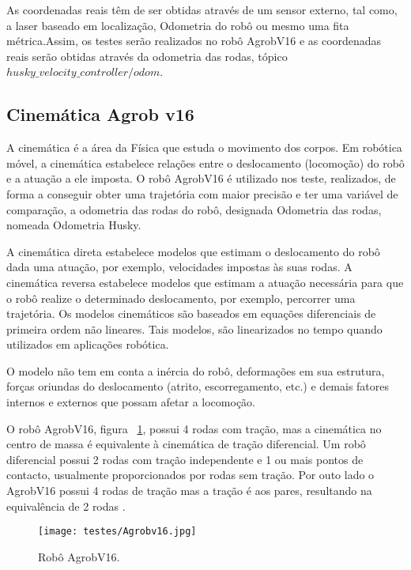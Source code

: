 As coordenadas reais têm de ser obtidas através de um sensor externo, tal como, a laser baseado em localização, Odometria do robô ou mesmo uma fita métrica.Assim, os testes serão realizados no robô AgrobV16 e as coordenadas reais serão obtidas através da odometria das rodas, tópico \textit{$husky\_velocity\_controller/odom$}.

\subsection{Cinemática Agrob v16}

A cinemática é a área da Física que estuda o movimento dos corpos. Em robótica móvel, a cinemática estabelece relações entre o deslocamento (locomoção) do robô e a atuação a ele imposta. O robô AgrobV16 é utilizado nos teste, realizados, de forma a conseguir obter uma trajetória com maior precisão e ter uma variável de comparação, a odometria das rodas do robô, designada  Odometria das rodas, nomeada Odometria Husky. 

A cinemática direta estabelece modelos que estimam o deslocamento do robô dada uma atuação, por exemplo, velocidades impostas às suas rodas. A cinemática reversa estabelece modelos que estimam a atuação necessária para que o robô realize o determinado deslocamento, por exemplo, percorrer uma trajetória. Os modelos cinemáticos são baseados em equações diferenciais de primeira ordem não lineares. Tais modelos, são linearizados no tempo quando utilizados em aplicações robótica.


O modelo não tem em conta a inércia do robô, deformações em sua estrutura, forças oriundas do deslocamento (atrito, escorregamento, etc.) e demais fatores internos e externos que possam afetar a locomoção.


O robô AgrobV16, figura ~\ref{fig:agrobv16}, possui 4 rodas com tração, mas a cinemática no centro de massa é equivalente à cinemática de tração diferencial. Um robô diferencial possui 2 rodas com tração independente e 1 ou mais pontos de contacto, usualmente proporcionados por rodas sem tração. Por outo lado o AgrobV16 possui 4 rodas de tração mas a tração é aos pares, resultando na equivalência de 2 rodas .


\begin{figure}[h!] %
	\begin{center}
		\leavevmode		
		\texttt{[image: testes/Agrobv16.jpg]}
		\caption{Robô AgrobV16.}
		\label{fig:agrobv16}
	\end{center}
\end{figure}




